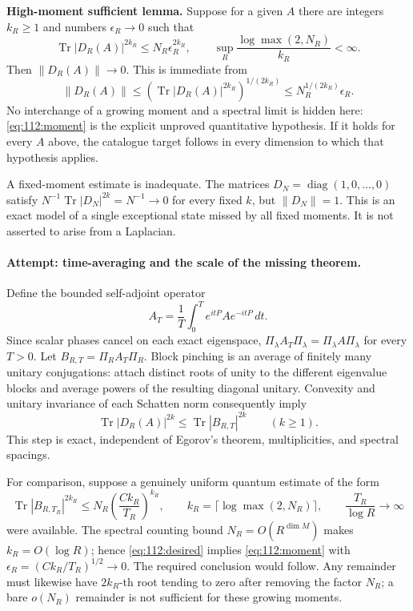 \documentclass[11pt,a4paper]{article}
\numberwithin{equation}{section}
\begin{document}
\textbf{High-moment sufficient lemma.}
Suppose for a given $A$ there are integers $k_R\geq1$ and numbers
$\epsilon_R\to0$ such that
\begin{equation}\label{eq:112:moment}
 \operatorname{Tr}|D_R(A)|^{2k_R}\leq N_R\epsilon_R^{2k_R},
 \qquad \sup_R\frac{\log\max(2,N_R)}{k_R}<\infty.
\end{equation}
Then $\|D_R(A)\|\to0$. This is immediate from
\[
 \|D_R(A)\|\leq
 (\operatorname{Tr}|D_R(A)|^{2k_R})^{1/(2k_R)}
 \leq N_R^{1/(2k_R)}\epsilon_R.
\]
No interchange of a growing moment and a spectral limit is hidden here:
\eqref{eq:112:moment} is the explicit unproved quantitative hypothesis.
If it holds for every $A$ above, the catalogue target follows in every
dimension to which that hypothesis applies.

A fixed-moment estimate is inadequate. The matrices
$D_N=\operatorname{diag}(1,0,\ldots,0)$ satisfy
$N^{-1}\operatorname{Tr}|D_N|^{2k}=N^{-1}\to0$ for every fixed $k$, but
$\|D_N\|=1$. This is an exact model of a single exceptional state missed
by all fixed moments. It is not asserted to arise from a Laplacian.

\paragraph{Attempt: time-averaging and the scale of the missing theorem.}
Define the bounded self-adjoint operator
\[
 A_T=\frac1T\int_0^T e^{itP}Ae^{-itP}\,dt.
\]
Since scalar phases cancel on each exact eigenspace,
$\Pi_\lambda A_T\Pi_\lambda=\Pi_\lambda A\Pi_\lambda$ for every $T>0$.
Let $B_{R,T}=\Pi_R A_T\Pi_R$. Block pinching is an average of finitely
many unitary conjugations: attach distinct roots of unity to the different
eigenvalue blocks and average powers of the resulting diagonal unitary.
Convexity and unitary invariance of each Schatten norm consequently imply
\begin{equation}\label{eq:112:pinching}
 \operatorname{Tr}|D_R(A)|^{2k}
 \leq\operatorname{Tr}|B_{R,T}|^{2k}\qquad(k\geq1).
\end{equation}
This step is exact, independent of Egorov's theorem, multiplicities, and
spectral spacings.

For comparison, suppose a genuinely uniform quantum estimate of the form
\begin{equation}\label{eq:112:desired}
 \operatorname{Tr}|B_{R,T_R}|^{2k_R}
 \leq N_R\left(\frac{Ck_R}{T_R}\right)^{k_R},\qquad
 k_R=\lceil\log\max(2,N_R)\rceil,
 \qquad \frac{T_R}{\log R}\longrightarrow\infty
\end{equation}
were available. The spectral counting bound $N_R=O(R^{\dim M})$ makes
$k_R=O(\log R)$; hence \eqref{eq:112:desired} implies
\eqref{eq:112:moment} with $\epsilon_R=(Ck_R/T_R)^{1/2}\to0$.
The required conclusion would follow. Any remainder must likewise have
$2k_R$-th root tending to zero after removing the factor $N_R$; a bare
$o(N_R)$ remainder is not sufficient for these growing moments.
\end{document}
